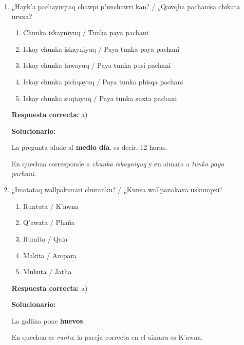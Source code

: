 \begin{enumerate}[resume]

	
	\item ¿Hayk’a pachayuqtaq chawpi p’unchawri kan? / ¿Qawqha pachanisa chikata uruxa?
	\begin{enumerate}[label=\alph*)]
		\item Chunka iskayniyuq / Tunka paya pachani
		\item Iskay chunka iskayniyuq / Paya tunka paya pachani
		\item Iskay chunka tawayuq / Paya tunka pusi pachani
		\item Iskay chunka pichqayuq / Paya tunka phisqa pachani
		\item Iskay chunka suqtayuq / Paya tunka suxta pachani
	\end{enumerate}
	\textbf{Respuesta correcta:} a)
	
	\vspace{2mm}
	\textbf{Solucionario:}
	
	La pregunta alude al \textbf{medio día}, es decir, 12 horas.
	
	En quechua corresponde a \textit{chunka iskayniyuq} y en aimara a \textit{tunka paya pachani}.
	

	
	\vspace{6mm}
	
	\item ¿Imatataq wallpakunari churanku? / ¿Kunsa wallpanakaxa uskumpxi?
	\begin{enumerate}[label=\alph*)]
		\item Runtuta / K'awna
		\item Q’awata / Phaña
		\item Rumita / Qala
		\item Makita / Ampara
		\item Muhuta / Jatha
	\end{enumerate}
	\textbf{Respuesta correcta:} a)
	
	\vspace{2mm}
	\textbf{Solucionario:}
	
	La gallina pone \textbf{huevos}.
	
	En quechua es \textit{runtu}; la pareja correcta en el aimara es K'awna.
	

	
	\vspace{6mm}
\end{enumerate}



